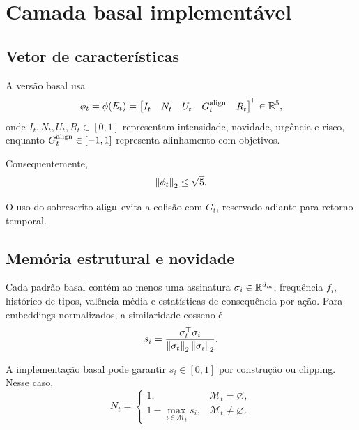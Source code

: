 \section{Camada basal implementável \EVPB}

\subsection{Vetor de características}

A versão basal usa
\begin{equation}
\phi_t=\phi(E_t)=
\begin{bmatrix}
I_t & N_t & U_t & G_t^{\rm align} & R_t
\end{bmatrix}^{\!\top}\in\mathbb{R}^5,
\label{eq:phi_base}
\end{equation}
onde \(I_t,N_t,U_t,R_t\in[0,1]\) representam intensidade, novidade, urgência e risco, enquanto \(G_t^{\rm align}\in[-1,1]\) representa alinhamento com objetivos.

Consequentemente,
\begin{equation}
\left\lVert \phi_t \right\rVert_2\le\sqrt{5}.
\label{eq:phi_bound}
\end{equation}

O uso do sobrescrito \({\rm align}\) evita a colisão com \(G_t\), reservado adiante para retorno temporal.

\subsection{Memória estrutural e novidade}

Cada padrão basal contém ao menos uma assinatura \(\sigma_i\in\mathbb{R}^{d_m}\), frequência \(f_i\), histórico de tipos, valência média e estatísticas de consequência por ação. Para embeddings normalizados, a similaridade cosseno é
\begin{equation}
s_i=\frac{\sigma_t^\top\sigma_i}{\left\lVert \sigma_t \right\rVert_2\left\lVert \sigma_i \right\rVert_2}.
\end{equation}

A implementação basal pode garantir \(s_i\in[0,1]\) por construção ou clipping. Nesse caso,
\begin{equation}
N_t=
\begin{cases}
1, & \mathcal M_t=\varnothing,\\[1mm]
1-\max_{i\in\mathcal M_t}s_i, & \mathcal M_t\neq\varnothing.
\end{cases}
\label{eq:novelty_base}
\end{equation}

